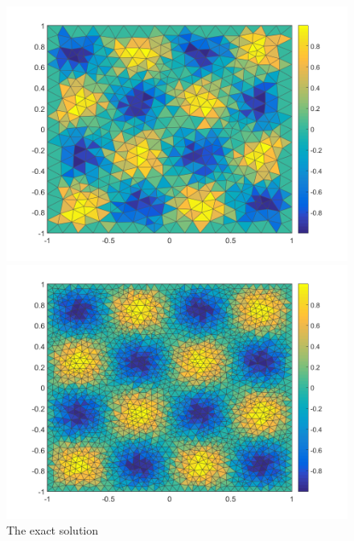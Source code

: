 \begin{figure}[!Hh]
\centering
\begin{minipage}{.5\textwidth}
  \centering
  \includegraphics[width=\linewidth]{./plots/01_1_8_exact}
\end{minipage}%
\begin{minipage}{.5\textwidth}
  \centering
  \includegraphics[width=\linewidth]{./plots/01_1_16_exact}
\end{minipage}
\caption{The exact solution}
\label{fig:1_exact}
\end{figure}

